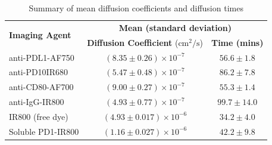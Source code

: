\begin{table}[H]
    \centering
    \caption{Summary of mean diffusion coefficients and diffusion times}
    \label{tab:diffusion_summary}
    \begin{tabular}{l|c|c}
        \hline
        \multirow{2}{*}{\textbf{Imaging Agent}} &
        \multicolumn{2}{c}{\textbf{Mean (standard deviation)}} \\
        \cline{2-3}
        & \textbf{Diffusion Coefficient} ($\mathrm{cm}^2/\mathrm{s}$) & \textbf{Time (mins)} \\
        \hline
        anti-PDL1-AF750       & $(8.35 \pm 0.26) \times 10^{-7}$  & $56.6 \pm 1.8$ \\
        \hline
        anti-PD10IR680        & $(5.47 \pm 0.48) \times 10^{-7}$  & $86.2 \pm 7.8$ \\
        \hline
        anti-CD80-AF700       & $(9.00 \pm 0.27) \times 10^{-7}$  & $55.3 \pm 1.4$ \\
        \hline
        anti-IgG-IR800        & $(4.93 \pm 0.77) \times 10^{-7}$  & $99.7 \pm 14.0$ \\
        \hline
        IR800 (free dye)      & $(4.93 \pm 0.017) \times 10^{-6}$ & $34.2 \pm 4.0$ \\
        \hline
        Soluble PD1-IR800     & $(1.16 \pm 0.027) \times 10^{-6}$ & $42.2 \pm 9.8$ \\
        \hline
    \end{tabular}
\end{table}

